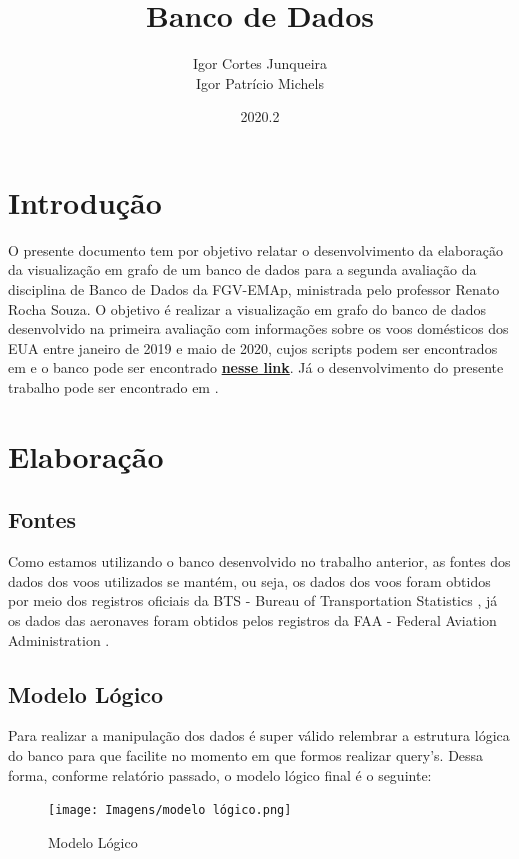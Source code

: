 \documentclass{article}
\title{Banco de Dados}
\author{Igor Cortes Junqueira \\ Igor Patrício Michels}
\date{2020.2}
\begin{document}
\maketitle

\section{Introdução}

O presente documento tem por objetivo relatar o desenvolvimento da elaboração da visualização em grafo de um banco de dados para a segunda avaliação da disciplina de Banco de Dados da FGV-EMAp, ministrada pelo professor Renato Rocha Souza. O objetivo é realizar a visualização em grafo do banco de dados desenvolvido na primeira avaliação com informações sobre os voos domésticos dos EUA entre janeiro de 2019 e maio de 2020, cujos scripts podem ser encontrados em \cite{github} e o banco pode ser encontrado \href{https://gvmail-my.sharepoint.com/:f:/g/personal/b39254_fgv_edu_br/Ev8i0xwOqnFFh_q3gTqvNAkBhzL_dpV6_ljzh82vJsTnNg?e=7ubrsl}{\textbf{nesse link}}. Já o desenvolvimento do presente trabalho pode ser encontrado em \cite{github2}.

\section{Elaboração}

\subsection{Fontes}

Como estamos utilizando o banco desenvolvido no trabalho anterior, as fontes dos dados dos voos utilizados se mantém, ou seja, os dados dos voos foram obtidos por meio dos registros oficiais da BTS - Bureau of Transportation Statistics \cite{BTS}, já os dados das aeronaves foram obtidos pelos registros da FAA - Federal Aviation Administration \cite{FAA}.

\subsection{Modelo Lógico}

Para realizar a manipulação dos dados é super válido relembrar a estrutura lógica do banco para que facilite no momento em que formos realizar query's. Dessa forma, conforme relatório passado, o modelo lógico final é o seguinte:

\begin{figure}
    \centering
    \texttt{[image: Imagens/modelo lógico.png]}
    \caption{Modelo Lógico}
    \label{lógico}
\end{figure}
\end{document}
